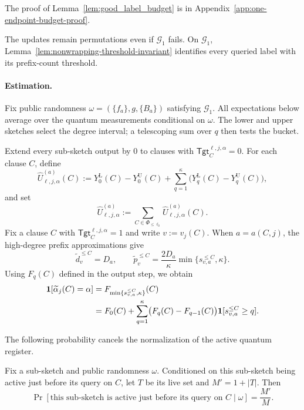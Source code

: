The proof of Lemma~\ref{lem:good_label_budget} is in Appendix~\ref{app:one-endpoint-budget-proof}.

The updates remain permutations even if $\mathcal G_1$ fails. On $\mathcal G_1$, Lemma~\ref{lem:nonwrapping-threshold-invariant} identifies every queried label with its prefix-count threshold.

\paragraph{Estimation.}
Fix public randomness $\omega=(\{f_a\},g,\{B_a\})$ satisfying $\mathcal G_1$. All expectations below average over the quantum measurements conditional on $\omega$. The lower and upper sketches select the degree interval; a telescoping sum over $q$ then tests the bucket.

Extend every sub-sketch output by $0$ to clauses with $\mathsf{Tgt}^{\ell,j,\alpha}_{C}=0$. For each clause $C$, define
\begin{equation}\label{eq:estimation}
\widehat U^{(a)}_{\ell,j,\alpha}(C)
:=
Y_0^{\mathrm L}(C)-Y_0^{\mathrm U}(C)
+\sum_{q=1}^{\kappa}\bigl(Y_q^{\mathrm L}(C)-Y_q^{\mathrm U}(C)\bigr),
\end{equation}
and set
\[
\widehat U^{(a)}_{\ell,j,\alpha}
:=\sum_{C\in\Phi_{\le\ell_0}}\widehat U^{(a)}_{\ell,j,\alpha}(C).
\]
Fix a clause $C$ with $\mathsf{Tgt}^{\ell,j,\alpha}_{C}=1$ and write $v:=v_j(C)$. When $a=a(C,j)$, the high-degree prefix approximations give
\[
\widetilde d_v^{\le C}=D_a,\qquad
\widetilde p_v^{\le C}
=\frac{2D_a}{\kappa}\min\{s_{v,a}^{\le C},\kappa\}.
\]
Using $F_q(C)$ defined in the output step, we obtain
\begin{equation}\label{eq:Fq}
\begin{aligned}
\mathbf 1[\widetilde\alpha_j(C)=\alpha]
&=F_{\min\{s_{v,a}^{\le C},\kappa\}}(C)\\
&=F_0(C)+\sum_{q=1}^{\kappa}
\bigl(F_q(C)-F_{q-1}(C)\bigr)\mathbf 1[s_{v,a}^{\le C}\ge q].
\end{aligned}
\end{equation}

The following probability cancels the normalization of the active quantum register.

\begin{lemma}\label{lem:active_prob}
Fix a sub-sketch and public randomness $\omega$. Conditioned on this sub-sketch being active just before its query on $C$, let $T$ be its live set and $M'=1+|T|$. Then
\[
\Pr[\text{this sub-sketch is active just before its query on }C\mid\omega]
=\frac{M'}{M}.
\]
\end{lemma}

